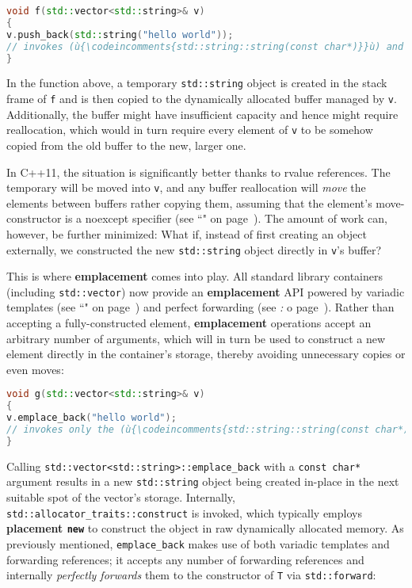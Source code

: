 \begin{lstlisting}[language=C++]
void f(std::vector<std::string>& v)
{
v.push_back(std::string("hello world"));
// invokes (ù{\codeincomments{std::string::string(const char*)}}ù) and the copy-constructor
}
\end{lstlisting}

\noindent In the function above, a temporary \texttt{std::string} object is
created in the stack frame of \texttt{f} and is then copied to the
dynamically allocated buffer managed by \texttt{v}. Additionally, the
buffer might have insufficient capacity and hence might require
reallocation, which would in turn require every element of \texttt{v} to
be somehow copied from the old buffer to the new, larger one.

In C++11, the situation is significantly better thanks to
rvalue references. The temporary will be moved into
\texttt{v}, and any buffer reallocation will \emph{move} the elements
between buffers rather copying them, assuming that the element's
move-constructor is a noexcept specifier (see ``" on page~\pageref{noexcept-specifier}). The amount of work
can, however, be further minimized: What if, instead of first creating
an object externally, we constructed the new \texttt{std::string} object
directly in \texttt{v}'s buffer?

This is where \textbf{emplacement} comes into play. All standard library
containers (including \texttt{std::vector}) now provide an
\textbf{emplacement} API powered by variadic templates (see ``" on page~\pageref{variadictemplate})
and perfect forwarding (see \textit{: } o page~\pageref{perfect-forwarding-for-generic-factory-functions}). Rather than accepting a
fully-constructed element, \textbf{emplacement} operations accept an
arbitrary number of arguments, which will in turn be used to construct a
new element directly in the container's storage, thereby avoiding
unnecessary copies or even moves:

\begin{lstlisting}[language=C++]
void g(std::vector<std::string>& v)
{
v.emplace_back("hello world");
// invokes only the (ù{\codeincomments{std::string::string(const char*)}}ù) constructor
}
\end{lstlisting}

\noindent Calling \texttt{std::vector<std::string>::emplace\_back} with a
\texttt{const}~\texttt{char*} argument results in a new
\texttt{std::string} object being created in-place in the next suitable
spot of the vector's storage. Internally,
\texttt{std::allocator\_traits::construct} is invoked, which typically
employs \textbf{placement \texttt{new}} to construct the object in raw
dynamically allocated memory. As previously mentioned,
\texttt{emplace\_back} makes use of both variadic
templates and forwarding references; it accepts any
number of forwarding references and internally \textit{perfectly forwards} them
to the constructor of \texttt{T} via \texttt{std::forward}:

